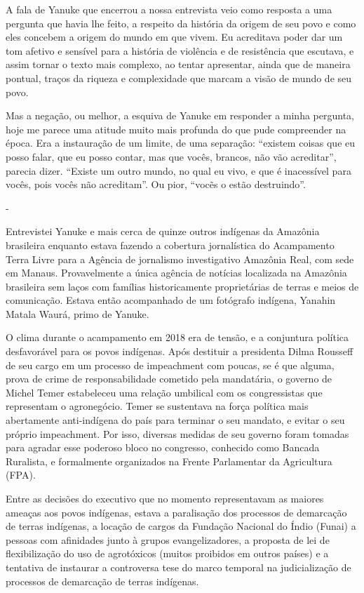 A fala de Yanuke que encerrou a nossa entrevista veio como resposta a
uma pergunta que havia lhe feito, a respeito da história da origem de
seu povo e como eles concebem a origem do mundo em que vivem. Eu
acreditava poder dar um tom afetivo e sensível para a história de
violência e de resistência que escutava, e assim tornar o texto mais
complexo, ao tentar apresentar, ainda que de maneira pontual, traços da
riqueza e complexidade que marcam a visão de mundo de seu povo.

Mas a negação, ou melhor, a esquiva de Yanuke em responder a minha
pergunta, hoje me parece uma atitude muito mais profunda do que pude
compreender na época. Era a instauração de um limite, de uma separação:
``existem coisas que eu posso falar, que eu posso contar, mas que vocês,
brancos, não vão acreditar'', parecia dizer. ``Existe um outro mundo, no
qual eu vivo, e que é inacessível para vocês, pois vocês não
acreditam''. Ou pior, ``vocẽs o estão destruindo''.

-

Entrevistei Yanuke e mais cerca de quinze outros indígenas da Amazônia
brasileira enquanto estava fazendo a cobertura jornalística do
Acampamento Terra Livre para a Agência de jornalismo investigativo
Amazônia Real, com sede em Manaus. Provavelmente a única agência de
notícias localizada na Amazônia brasileira sem laços com famílias
historicamente proprietárias de terras e meios de comunicação. Estava
então acompanhado de um fotógrafo indígena, Yanahin Matala Waurá, primo
de Yanuke.

O clima durante o acampamento em 2018 era de tensão, e a conjuntura
política desfavorável para os povos indígenas. Após destituir a
presidenta Dilma Rousseff de seu cargo em um processo de impeachment com
poucas, se é que alguma, prova de crime de responsabilidade cometido
pela mandatária, o governo de Michel Temer estabeleceu uma relação
umbilical com os congressistas que representam o agronegócio. Temer se
sustentava na força política mais abertamente anti-indígena do país para
terminar o seu mandato, e evitar o seu próprio impeachment. Por isso,
diversas medidas de seu governo foram tomadas para agradar esse poderoso
bloco no congresso, conhecido como Bancada Ruralista, e formalmente
organizados na Frente Parlamentar da Agricultura (FPA).

Entre as decisões do executivo que no momento representavam as maiores
ameaças aos povos indígenas, estava a paralisação dos processos de
demarcação de terras indígenas, a locação de cargos da Fundação Nacional
do Índio (Funai) a pessoas com afinidades junto à grupos
evangelizadores, a proposta de lei de flexibilização do uso de
agrotóxicos (muitos proibidos em outros países) e a tentativa de
instaurar a controversa tese do marco temporal na judicialização de
processos de demarcação de terras indígenas.

